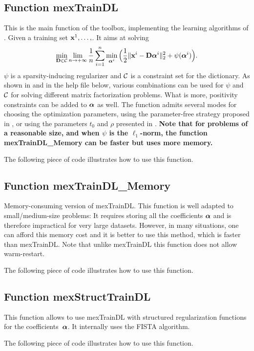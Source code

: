 \documentclass[a4paper, 11pt]{article}
\begin{document}
\subsection{Function mexTrainDL}
This is the main function of the toolbox, implementing the learning algorithms of \cite{mairal9}. 
Given a training set ${\mathbf x}^1,\ldots,  $. It aims at solving
\begin{equation}
\min_{{\mathbf D} \in {\mathcal C}} \lim_{n \to +\infty} \frac{1}{n} \sum_{i=1}^n \min_{{\boldsymbol\alpha}^i} \Big( \frac{1}{2} \|{\mathbf x}^i-{\mathbf D}{\boldsymbol\alpha}^i\|_2^2 + \psi({\boldsymbol\alpha}^i)\Big).
\end{equation}
$\psi$ is a sparsity-inducing regularizer and ${\mathcal C}$ is a constraint set for the dictionary. As shown in \cite{mairal9} 
and in the help file below, various combinations can be used for $\psi$ and ${\mathcal C}$ for solving different matrix factorization problems.
What is more, positivity constraints can be added to ${\boldsymbol\alpha}$ as well. The function admits several modes for choosing the optimization parameters, using the parameter-free strategy proposed in \cite{mairal7}, or using the parameters $t_0$ and $\rho$ presented
in \cite{mairal9}. {\bf Note that for problems of a reasonable size, and when $\psi$ is the $\ell_1$-norm, 
   the function mexTrainDL\_Memory can be faster but uses more memory.} 



The following piece of code illustrates how to use this function.



\subsection{Function mexTrainDL\_Memory}
Memory-consuming version of mexTrainDL. This function is well adapted to small/medium-size problems:
It requires storing all the coefficients ${\boldsymbol\alpha}$ and is therefore impractical
for very large datasets. However, in many situations, one can afford this memory cost and it is better to use this method, which 
is faster than mexTrainDL.
Note that unlike mexTrainDL this function does not allow warm-restart.


The following piece of code illustrates how to use this function.


\subsection{Function mexStructTrainDL}
This function allows to use mexTrainDL with structured regularization functions
for the coefficients~${\boldsymbol\alpha}$. It internally uses the FISTA algorithm.

The following piece of code illustrates how to use this function.

\end{document}
